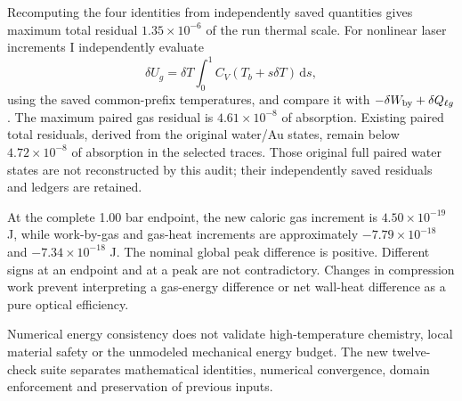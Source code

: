 \documentclass[10pt,a4paper]{article}
\newcommand{\dd}{\mathrm d}
\begin{document}
Recomputing the four identities from independently saved quantities gives maximum total residual $1.35\times10^{-6}$ of the run thermal scale. For nonlinear laser increments I independently evaluate
\begin{equation}
\delta U_g=\delta T\int_0^1 C_V(T_b+s\delta T)\,\dd s,
\end{equation}
using the saved common-prefix temperatures, and compare it with $-\delta W_{\rm by}+\delta Q_{\ell g}$. The maximum paired gas residual is $4.61\times10^{-8}$ of absorption. Existing paired total residuals, derived from the original water/Au states, remain below $4.72\times10^{-8}$ of absorption in the selected traces. Those original full paired water states are not reconstructed by this audit; their independently saved residuals and ledgers are retained.

At the complete 1.00 bar endpoint, the new caloric gas increment is $4.50\times10^{-19}$ J, while work-by-gas and gas-heat increments are approximately $-7.79\times10^{-18}$ and $-7.34\times10^{-18}$ J. The nominal global peak difference is positive. Different signs at an endpoint and at a peak are not contradictory. Changes in compression work prevent interpreting a gas-energy difference or net wall-heat difference as a pure optical efficiency.

Numerical energy consistency does not validate high-temperature chemistry, local material safety or the unmodeled mechanical energy budget. The new twelve-check suite separates mathematical identities, numerical convergence, domain enforcement and preservation of previous inputs.
\clearpage
\end{document}
